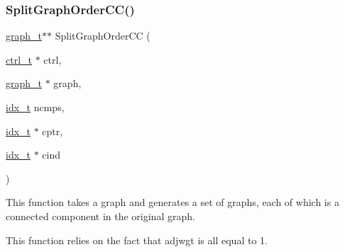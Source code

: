 \subsubsection{\texorpdfstring{Split\+Graph\+Order\+C\+C()}{SplitGraphOrderCC()}}
{\footnotesize\ttfamily \hyperlink{a00734}{graph\+\_\+t}$\ast$$\ast$ Split\+Graph\+Order\+CC (\begin{DoxyParamCaption}\item[{\hyperlink{a00742}{ctrl\+\_\+t} $\ast$}]{ctrl,  }\item[{\hyperlink{a00734}{graph\+\_\+t} $\ast$}]{graph,  }\item[{\hyperlink{a00876_aaa5262be3e700770163401acb0150f52}{idx\+\_\+t}}]{ncmps,  }\item[{\hyperlink{a00876_aaa5262be3e700770163401acb0150f52}{idx\+\_\+t} $\ast$}]{cptr,  }\item[{\hyperlink{a00876_aaa5262be3e700770163401acb0150f52}{idx\+\_\+t} $\ast$}]{cind }\end{DoxyParamCaption})}

This function takes a graph and generates a set of graphs, each of which is a connected component in the original graph.

This function relies on the fact that adjwgt is all equal to 1.



